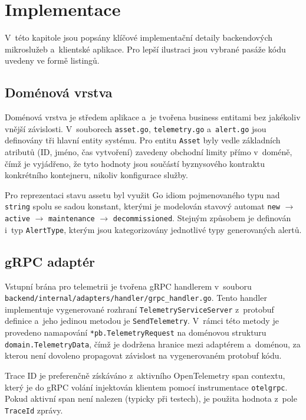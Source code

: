 \documentclass[11pt, a4paper, oneside]{article}
\begin{document}
\clearpage
\section{Implementace}

V~této kapitole jsou popsány klíčové implementační detaily backendových mikroslužeb a~klientské aplikace. Pro lepší ilustraci jsou vybrané pasáže kódu uvedeny ve formě listingů.

\subsection{Doménová vrstva}

Doménová vrstva je středem aplikace a~je tvořena business entitami bez jakékoliv vnější závislosti. V~souborech \texttt{asset.go}, \texttt{telemetry.go} a~\texttt{alert.go} jsou definovány tři hlavní entity systému. Pro entitu \texttt{Asset} byly vedle základních atributů (ID, jméno, čas vytvoření) zavedeny obchodní limity přímo v~doméně, čímž je vyjádřeno, že tyto hodnoty jsou součástí byznysového kontraktu konkrétního kontejneru, nikoliv konfigurace služby.

Pro reprezentaci stavu assetu byl využit Go idiom pojmenovaného typu nad \texttt{string} spolu se sadou konstant, kterými je modelován stavový automat \texttt{new} $\rightarrow$ \texttt{active} $\rightarrow$ \texttt{maintenance} $\rightarrow$ \texttt{decommissioned}. Stejným způsobem je definován i~typ \texttt{AlertType}, kterým jsou kategorizovány jednotlivé typy generovaných alertů.

\subsection{gRPC adaptér}

Vstupní brána pro telemetrii je tvořena gRPC handlerem v~souboru \texttt{backend/internal/adapters/handler/grpc\_handler.go}. Tento handler implementuje vygenerované rozhraní \texttt{Telemetry\-Service\-Server} z~protobuf definice a~jeho jedinou metodou je \texttt{Send\-Telemetry}. V~rámci této metody je provedeno namapování \texttt{*pb.TelemetryRequest} na doménovou strukturu \texttt{domain.Telemetry\-Data}, čímž je dodržena hranice mezi adaptérem a~doménou, za kterou není dovoleno propagovat závislost na vygenerovaném protobuf kódu.

Trace ID je preferenčně získáváno z~aktivního OpenTelemetry span contextu, který je do gRPC volání injektován klientem pomocí instrumentace \texttt{otelgrpc}. Pokud aktivní span není nalezen (typicky při testech), je použita hodnota z~pole \texttt{TraceId} zprávy.
\end{document}
